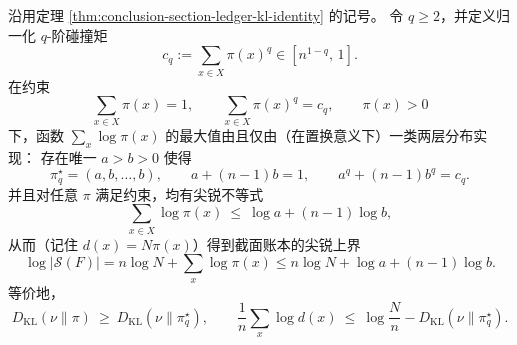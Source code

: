 \begin{theorem}[给定碰撞矩约束下的截面账本尖锐上界]\label{thm:conclusion-section-ledger-collision-moment-sharp-bound}
沿用定理 \ref{thm:conclusion-section-ledger-kl-identity} 的记号。
令 \(q\ge 2\)，并定义归一化 \(q\)-阶碰撞矩
\[
c_q:=\sum_{x\in X}\pi(x)^q\in\left[n^{1-q},\,1\right].
\]
在约束
\[
\sum_{x\in X}\pi(x)=1,
\qquad
\sum_{x\in X}\pi(x)^q=c_q,
\qquad
\pi(x)>0
\]
下，函数
\(
\sum_x\log\pi(x)
\)
的最大值由且仅由（在置换意义下）一类两层分布实现：
存在唯一 \(a>b>0\) 使得
\[
\pi^\star_q=(a,b,\dots,b),
\qquad
a+(n-1)b=1,
\qquad
a^q+(n-1)b^q=c_q.
\]
并且对任意 \(\pi\) 满足约束，均有尖锐不等式
\[
\sum_{x\in X}\log\pi(x)\ \le\ \log a+(n-1)\log b,
\]
从而（记住 \(d(x)=N\pi(x)\)）得到截面账本的尖锐上界
\[
\log|\mathcal S(F)|
=n\log N+\sum_x\log\pi(x)
\le
n\log N+\log a+(n-1)\log b.
\]
等价地，
\[
D_{\mathrm{KL}}(\nu\|\pi)\ \ge\ D_{\mathrm{KL}}(\nu\|\pi^\star_q),
\qquad
\frac1n\sum_x\log d(x)\ \le\ \log\frac{N}{n}-D_{\mathrm{KL}}(\nu\|\pi^\star_q).
\]
\end{theorem}

